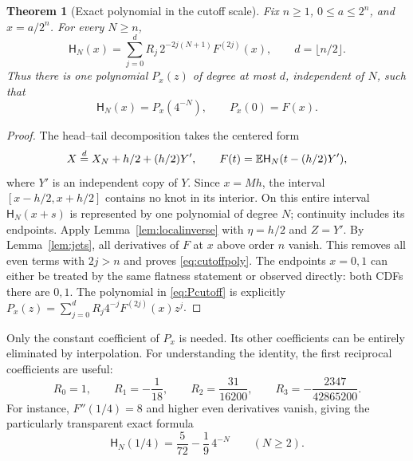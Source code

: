 \documentclass[11pt,oneside]{article}
\newtheorem{theorem}{Theorem}[section]
\theoremstyle{definition}\newtheorem{definition}[theorem]{Definition}
\theoremstyle{remark}\newtheorem{remark}[theorem]{Remark}
\begin{document}
\begin{theorem}[Exact polynomial in the cutoff scale]
\label{thm:cutoff}
Fix $n\ge1$, $0\le a\le2^n$, and $x=a/2^n$. For every $N\ge n$,
\begin{equation}
 \boxed{\displaystyle
 \mathsf H_N(x)=\sum_{j=0}^{d}
      R_j\,2^{-2j(N+1)}F^{(2j)}(x),
 \qquad d=\lfloor n/2\rfloor.}
 \label{eq:cutoffpoly}
\end{equation}
Thus there is one polynomial $P_x(z)$ of degree at most $d$, independent of
$N$, such that
\begin{equation}
 \mathsf H_N(x)=P_x(4^{-N}),\qquad P_x(0)=F(x).
 \label{eq:Pcutoff}
\end{equation}
\end{theorem}
\begin{proof}
The head--tail decomposition takes the centered form
\[
 X\overset d=X_N+h/2+(h/2)Y',\qquad
 F(t)=\mathbb E\mathsf H_N(t-(h/2)Y'),
\]
where $Y'$ is an independent copy of $Y$. Since $x=Mh$, the interval
$[x-h/2,x+h/2]$ contains no knot in its interior. On this entire interval
$\mathsf H_N(x+s)$ is represented by one polynomial of degree $N$;
continuity includes its endpoints. Apply Lemma~\ref{lem:localinverse} with
$\eta=h/2$ and $Z=Y'$. By Lemma~\ref{lem:jets}, all derivatives of $F$ at $x$
above order $n$ vanish. This removes all even terms with $2j>n$ and proves
\eqref{eq:cutoffpoly}. The endpoints $x=0,1$ can either be treated by the
same flatness statement or observed directly: both CDFs there are $0,1$.
The polynomial in \eqref{eq:Pcutoff} is explicitly
$P_x(z)=\sum_{j=0}^{d}R_j4^{-j}F^{(2j)}(x)z^j$.
\end{proof}

Only the constant coefficient of $P_x$ is needed. Its other coefficients
can be entirely eliminated by interpolation. For understanding the identity,
the first reciprocal coefficients are useful:
\begin{equation}
 R_0=1,\qquad R_1=-\frac1{18},\qquad
 R_2=\frac{31}{16200},\qquad R_3=-\frac{2347}{42865200}.
 \label{eq:firstR}
\end{equation}
For instance, $F''(1/4)=8$ and higher even derivatives vanish, giving the
particularly transparent exact formula
\begin{equation}
 \mathsf H_N(1/4)=\frac5{72}-\frac19\,4^{-N}\qquad(N\ge2).
 \label{eq:quarterexamplepoly}
\end{equation}
\end{document}
